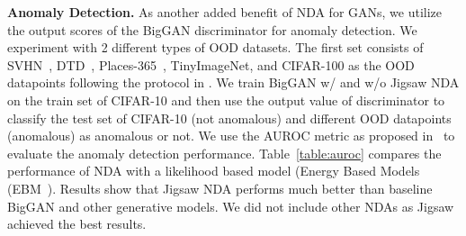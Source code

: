 \documentclass{article} \usepackage{iclr2021_conference,times}
\begin{document}
\textbf{Anomaly Detection.}
\label{section:anomaly}
As another added benefit of NDA for GANs, we utilize the output scores of the BigGAN discriminator for anomaly detection. We experiment with 2 different types of OOD datasets.
The first set consists of SVHN~\citep{netzer2011reading}, DTD~\citep{cimpoi14describing}, Places-365~\citep{zhou2017places}, TinyImageNet, and CIFAR-100 as the OOD datapoints following the protocol in \citep{du2019implicit,hendrycks2018deep}. 
We train BigGAN w/ and w/o Jigsaw NDA on the train set of CIFAR-10 and then use the output value of discriminator to classify the test set of CIFAR-10 (not anomalous) and different OOD datapoints (anomalous) as anomalous or not. We use the AUROC metric as proposed in~\citep{hendrycks2016baseline} to evaluate the anomaly detection performance. Table~\ref{table:auroc} compares the performance of NDA with a likelihood based model (Energy Based Models (EBM~\citep{du2019implicit}).
Results show that Jigsaw NDA performs much better than baseline BigGAN and other generative models. We did not include other NDAs as Jigsaw achieved the best results.



\begin{comment}
\begin{table}[!h]
  \caption{AUROC scores for different OOD datasets. OOD-1 contains different datasets, while OOD-2 contains the set of 19 different corruptions in CIFAR-10-C~\citep{hendrycks2018benchmarking} (the average score is reported). PixelCNN++ and Glow numbers are from \citep{du2019implicit}.}
  \label{table:auroc}
  \centering
  \resizebox{0.5\textwidth}{!}{
  \begin{tabular}{l|l|lllll}
    \toprule
    {} & {} & \multicolumn{5}{c}{Generative Models}  \\
    \midrule
    & & BigGAN & Jigsaw & PixelCNN++ & Glow & EBM\\
    \midrule
\multirow{6}{*}{OOD-1} & DTD & 0.70 & 0.69 & 0.33 & 0.27 & 0.48 \\
& SVHN & 0.75 & 0.61 & 0.32 & 0.24 & 0.63 \\
    & Places-365 & 0.35 & 0.58 & - & - & 0.68 \\
    & TinyImageNet & 0.40 & 0.62 & - & - & 0.67\\
    & CIFAR-100 & 0.63 & 0.64 & - & - & 0.50\\
    \cmidrule{2-7}
    & Average & 0.57 & \textbf{0.63} & - & - &  0.59\\
    \midrule
    OOD-2 & CIFAR-10-C & 0.56 & \textbf{0.63} & - & - & 0.60\\
    \bottomrule
  \end{tabular}}
\end{table}
\end{comment}
\end{document}
